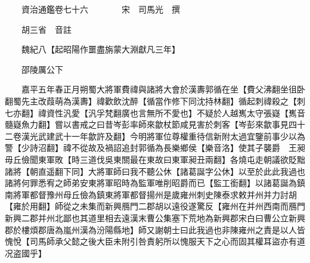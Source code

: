 










 


 
 


 

  
  
  
  
  





  
  
  
  
  
 
  

  

  
  
  



  

 
 

  
   




  

  
  


  　　資治通鑑卷七十六　　　　宋　司馬光　撰

　　胡三省　音註

　　魏紀八【起昭陽作噩盡旃蒙大淵獻凡三年】

　　邵陵厲公下

　　嘉平五年春正月朔蜀大將軍費禕與諸將大會於漢夀郭循在坐【費父沸翻坐徂卧翻蜀先主改葭萌為漢夀】禕歡飲沈醉【循當作修下同沈持林翻】循起刺禕殺之【刺七亦翻】禕資性汎愛【汎孚梵翻廣也言無所不愛也】不疑於人越嶲太守張嶷【嶲音髓嶷魚力翻】嘗以書戒之曰昔岑彭率師來歙杖節咸見害於刺客【岑彭來歙事見四十二卷漢光武建武十一年歙許及翻】今明將軍位尊權重待信新附太過宜鑒前事少以為警【少詩沼翻】禕不從故及禍詔追封郭循為長樂鄉侯【樂音洛】使其子襲爵　王昶毋丘儉聞東軍敗【時三道伐吳東關最在東故曰東軍昶丑兩翻】各燒屯走朝議欲貶黜諸將【朝直遥翻下同】大將軍師曰我不聽公休【諸葛誕字公休】以至於此此我過也諸將何罪悉宥之師弟安東將軍昭時為監軍唯削昭爵而已【監工銜翻】以諸葛誕為鎮南將軍都督豫州母丘儉為鎮東將軍都督揚州是歲雍州刺史陳泰求敕并州并力討胡【雍於用翻】師從之未集而新興鴈門二郡胡以遠役遂驚反【雍州在并州西南而鴈門新興二郡并州北鄙也其道里相去遠漢末曹公集塞下荒地為新興郡宋白曰曹公立新興郡於樓煩郡唐為嵐州漢為汾陽縣地】師又謝朝士曰此我過也非陳雍州之責是以人皆愧悅【司馬師承父懿之後大臣未附引咎責躬所以愧服天下之心而固其權耳盜亦有道况盗國乎】

